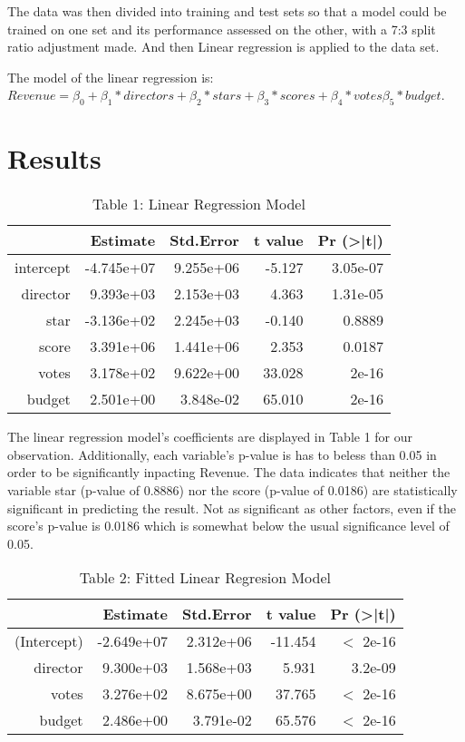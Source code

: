 \documentclass[12pt]{article}
\begin{document}
The data was then divided into training and test sets so that a model could be 
trained on one set and its performance assessed on the other, with a 7:3 split 
ratio adjustment made. And then Linear regression is applied to 
the data set.

The model of the linear regression is:
$Revenue = \beta_0 +\beta_1*directors + \beta_2*stars + \beta_3*scores + \beta_4*votes \beta_5*budget$.

\section{Results}
\label{sec:res}

\begin{table}[h]
\caption{Table 1: Linear Regression Model}
\centering
\begin{tabular}{rrrrr}
\hline
 & Estimate   & Std.Error & t value & Pr (\textgreater|t|) \\
 \hline
intercept & -4.745e+07 & 9.255e+06 & -5.127  & 3.05e-07 \\ 
director  & 9.393e+03  & 2.153e+03 & 4.363   & 1.31e-05 \\ 
star      & -3.136e+02 & 2.245e+03 & -0.140  & 0.8889 \\ 
score     & 3.391e+06  & 1.441e+06 & 2.353   & 0.0187 \\ 
votes     & 3.178e+02  & 9.622e+00 & 33.028  & 2e-16 \\ 
budget    & 2.501e+00  & 3.848e-02 & 65.010  & 2e-16 \\
\hline
\end{tabular}
\end{table}

The linear regression model's coefficients are displayed in Table 1 for our observation. 
Additionally, each variable's p-value is has to beless than 0.05 in order to be significantly
inpacting Revenue. The data indicates that neither the variable star (p-value of 0.8886) 
nor the score (p-value of 0.0186) are statistically significant in predicting the result.
Not as significant as other factors, even if the score's p-value is 0.0186 which is somewhat
below the usual significance level of 0.05.

\begin{table}[h]
\caption{Table 2: Fitted Linear Regresion Model}
\centering
\begin{tabular}{rrrrr}
\hline
 & Estimate   & Std.Error & t value & Pr (\textgreater|t|) \\ 
\hline
(Intercept) & -2.649e+07 & 2.312e+06 & -11.454 & $<$ 2e-16 \\
director    & 9.300e+03  & 1.568e+03 & 5.931   & 3.2e-09 \\
votes       & 3.276e+02  & 8.675e+00 & 37.765  & $<$ 2e-16 \\
budget      & 2.486e+00  & 3.791e-02 & 65.576  & $<$ 2e-16 \\
\hline
\end{tabular}
\end{table}
\end{document}
